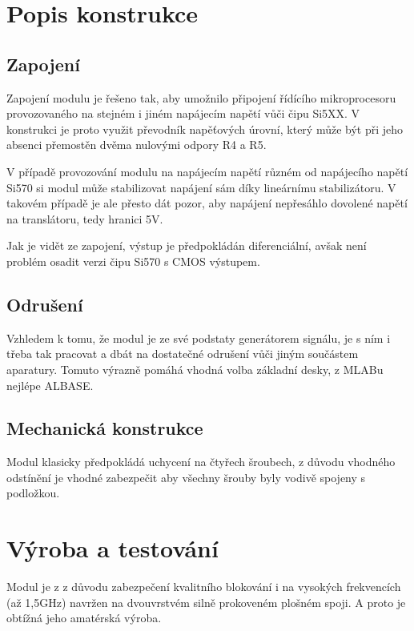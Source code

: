 \documentclass[12pt,a4paper,oneside]{article}
\begin{document}
\section{Popis konstrukce}

\subsection{Zapojení}
Zapojení modulu je řešeno tak, aby umožnilo připojení řídícího mikroprocesoru provozovaného na stejném i jiném napájecím napětí vůči čipu Si5XX. V konstrukci je proto využit převodník napěťových úrovní, který může být při jeho absenci přemostěn dvěma nulovými odpory R4 a R5.

V případě provozování modulu na napájecím napětí různém od napájecího napětí Si570 si modul může stabilizovat napájení sám díky lineárnímu stabilizátoru. V takovém případě je ale přesto dát pozor, aby napájení nepřesáhlo dovolené napětí na translátoru, tedy hranici 5V. 



Jak je vidět ze zapojení, výstup je předpokládán diferenciální, avšak není problém osadit verzi čipu Si570 s CMOS výstupem. 

\subsection{Odrušení}

Vzhledem k tomu, že modul je ze své podstaty generátorem signálu, je s ním i třeba tak pracovat a dbát na dostatečné odrušení vůči jiným součástem aparatury. Tomuto výrazně pomáhá vhodná volba základní desky, z MLABu nejlépe ALBASE.

\subsection{Mechanická konstrukce}

Modul klasicky předpokládá uchycení na čtyřech šroubech, z důvodu vhodného odstínění je vhodné zabezpečit aby všechny šrouby byly vodivě spojeny s podložkou.  

\section{Výroba a testování}
Modul je z z důvodu zabezpečení kvalitního blokování i na vysokých frekvencích (až 1,5GHz) navržen na dvouvrstvém silně prokoveném plošném spoji. A proto je obtížná jeho amatérská výroba.
\end{document}
